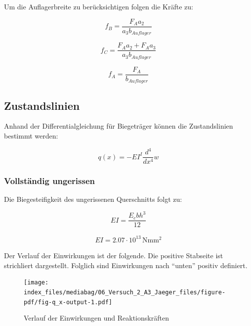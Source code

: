 \documentclass[
  12pt,
  letterpaper,
  egregdoesnotlikesansseriftitles]{scrreprt}
\begin{document}
Um die Auflagerbreite zu berücksichtigen folgen die Kräfte zu:

\begin{equation}f_{B} = \frac{F_{A} a_{2}}{a_{3} b_{Auflager}}\end{equation}

\begin{equation}f_{C} = \frac{F_{A} a_{2} + F_{A} a_{3}}{a_{3} b_{Auflager}}\end{equation}

\begin{equation}f_{A} = \frac{F_{A}}{b_{Auflager}}\end{equation}

\hypertarget{zustandslinien}{%
\subsection{Zustandslinien}\label{zustandslinien}}

Anhand der Differentialgleichung für Biegeträger können die
Zustandslinien bestimmt werden:

\begin{equation}q{\left(x \right)} = - EI^{I} \frac{d^{4}}{d x^{4}} w\end{equation}

\hypertarget{vollstuxe4ndig-ungerissen}{%
\subsubsection{Vollständig ungerissen}\label{vollstuxe4ndig-ungerissen}}

Die Biegesteifigkeit des ungerissenen Querschnitts folgt zu:

\begin{equation}EI = \frac{E_{c} b h^{3}}{12}\end{equation}

\begin{align}EI = 2.07 \cdot 10^{13} \, \mathrm{Nmm^2} \end{align}

Der Verlauf der Einwirkungen ist der folgende. Die positive Stabseite
ist strichliert dargestellt. Folglich sind Einwirkungen nach ``unten''
positiv definiert.

\begin{figure}[H]

{\centering \texttt{[image: index\_files/mediabag/06\_Versuch\_2\_A3\_Jaeger\_files/figure-pdf/fig-q\_x-output-1.pdf]}

}

\caption{\label{fig-q_x}Verlauf der Einwirkungen und Reaktionskräften}

\end{figure}
\end{document}
